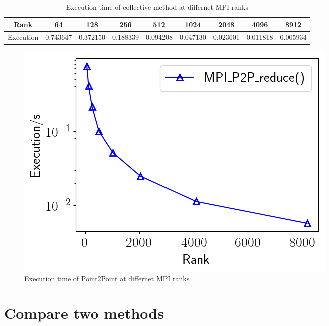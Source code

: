 \documentclass{article}
\begin{document}
\begin{table}[!htb]\centering
	\begin{tabular}{|c|c|c|c|c|c|c|c|c|}
		\hline
		Rank & 64 & 128 & 256 & 512 & 1024 & 2048 & 4096 & 8912\\
		\hline
		Execution & 0.743647 & 0.372150 & 0.188339 & 0.094208 & 0.047130 & 0.023601 & 0.011818 & 0.005934 \\
		\hline
	\end{tabular}
	\caption{ Execution time of collective method at differnet MPI ranks}
\end{table}

\begin{figure}[!htb]
	\centering   
	\includegraphics[scale=0.5]{../output/p2p.png}
	\caption{ Execution time of Point2Point at differnet MPI ranks}
\end{figure}


\section{Compare two methods}
\end{document}
